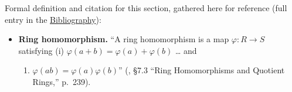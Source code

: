 Formal definition and citation for this section, gathered here for reference (full entry in the \hyperref[sec:root:bibliography:1]{Bibliography}):

\begin{itemize}
\tightlist
\item
  \textbf{Ring homomorphism.} ``A ring homomorphism is a map \(\varphi : R \to S\) satisfying (i) \(\varphi(a+b) = \varphi(a)+\varphi(b)\) \ldots{} and

  \begin{enumerate}
  \def\labelenumi{(\roman{enumi})}
  \setcounter{enumi}{1}
  \tightlist
  \item
    \(\varphi(ab) = \varphi(a)\varphi(b)\)'' (\cite{DummitFoote2003}, §7.3 ``Ring Homomorphisms and Quotient Rings,'' p.~239).
  \end{enumerate}
\end{itemize}
